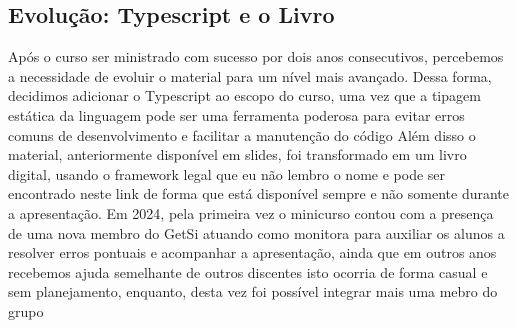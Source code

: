 \subsection{Evolução: Typescript e o Livro}
Após o curso ser ministrado com sucesso por dois anos consecutivos, percebemos a necessidade de evoluir o material para um nível mais avançado. Dessa forma, decidimos adicionar o Typescript ao escopo do curso, uma vez que a tipagem estática da linguagem pode ser uma ferramenta poderosa para evitar erros comuns de desenvolvimento e facilitar a manutenção do código 
Além disso o material, anteriormente disponível em slides, foi transformado em um livro digital, usando o framework legal que eu não lembro o nome  e pode ser encontrado neste link de forma que está disponível sempre e não somente durante a apresentação.
Em 2024, pela primeira vez o minicurso contou com a presença de uma nova membro do GetSi atuando como monitora para auxiliar os alunos a resolver erros pontuais e acompanhar a apresentação, ainda que em outros anos recebemos ajuda semelhante de outros discentes isto ocorria de forma casual e sem planejamento, enquanto, desta vez foi possível integrar mais uma mebro do grupo 
